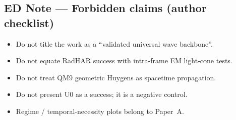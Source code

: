 \documentclass[twocolumn,10pt]{article}
\begin{document}
\subsection*{ED Note --- Forbidden claims (author checklist)}
\begin{itemize}
\item Do not title the work as a ``validated universal wave backbone''.
\item Do not equate RadHAR success with intra-frame EM light-cone tests.
\item Do not treat QM9 geometric Huygens as spacetime propagation.
\item Do not present U0 as a success; it is a negative control.
\item Regime / temporal-necessity plots belong to Paper~A.
\end{itemize}
\end{document}
